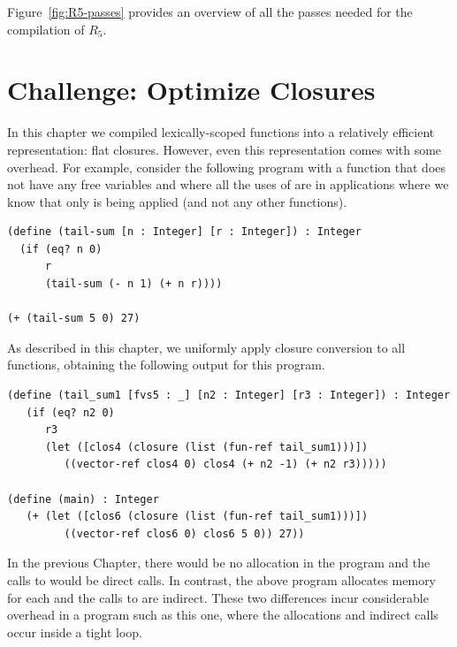 \documentclass[11pt]{book}
\begin{document}
Figure~\ref{fig:R5-passes} provides an overview of all the passes needed
for the compilation of $R_5$.

\clearpage

\section{Challenge: Optimize Closures}
\label{sec:optimize-closures}

In this chapter we compiled lexically-scoped functions into a
relatively efficient representation: flat closures. However, even this
representation comes with some overhead. For example, consider the
following program with a function  that does not have
any free variables and where all the uses of  are in
applications where we know that only  is being applied
(and not any other functions).
\begin{center}
\begin{minipage}{0.95\textwidth}
\begin{lstlisting}
(define (tail-sum [n : Integer] [r : Integer]) : Integer
  (if (eq? n 0)
      r
      (tail-sum (- n 1) (+ n r))))

(+ (tail-sum 5 0) 27)
\end{lstlisting}
\end{minipage}
\end{center}
As described in this chapter, we uniformly apply closure conversion to
all functions, obtaining the following output for this program.
\begin{center}
\begin{minipage}{0.95\textwidth}
\begin{lstlisting}
(define (tail_sum1 [fvs5 : _] [n2 : Integer] [r3 : Integer]) : Integer
   (if (eq? n2 0)
      r3
      (let ([clos4 (closure (list (fun-ref tail_sum1)))])
         ((vector-ref clos4 0) clos4 (+ n2 -1) (+ n2 r3)))))

(define (main) : Integer
   (+ (let ([clos6 (closure (list (fun-ref tail_sum1)))])
         ((vector-ref clos6 0) clos6 5 0)) 27))
\end{lstlisting}
\end{minipage}
\end{center}

In the previous Chapter, there would be no allocation in the program
and the calls to  would be direct calls. In contrast,
the above program allocates memory for each  and the
calls to  are indirect. These two differences incur
considerable overhead in a program such as this one, where the
allocations and indirect calls occur inside a tight loop.
\end{document}

